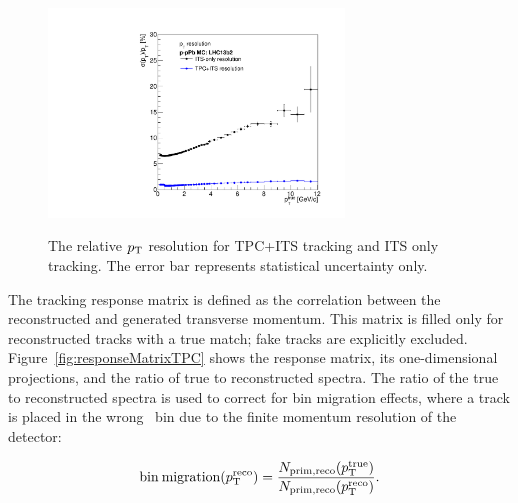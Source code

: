 \begin{figure}[hbtp]
\center
\includegraphics[width=0.7\textwidth]{Data_Analysis/Tracking/HybridAndITS_resolution_lowpt.pdf}\\
\caption{The relative $p_{\mathrm{T}}$ resolution for TPC+ITS tracking and ITS only tracking. The error bar represents statistical uncertainty only.}
\label{fig:resolution}
\end{figure}

The tracking response matrix is defined as the correlation between the reconstructed and generated transverse momentum. This matrix is filled only for reconstructed tracks with a true match; fake tracks are explicitly excluded. Figure~\ref{fig:responseMatrixTPC} shows the response matrix, its one-dimensional projections, and the ratio of true to reconstructed spectra. The ratio of the true to reconstructed spectra is used to correct for bin migration effects, where a track is placed in the wrong \pt~bin due to the finite momentum resolution of the detector:

\begin{equation}\label{eq:bin_migration}
\mathrm{bin\:migration} (p_{\mathrm{T}}^{\mathrm{reco}}) = \frac{N_{\mathrm{prim,reco}}(p_{\mathrm{T}}^{\mathrm{true}})}{N_{\mathrm{prim,reco}}(p_{\mathrm{T}}^{\mathrm{reco}})}.
\end{equation}

